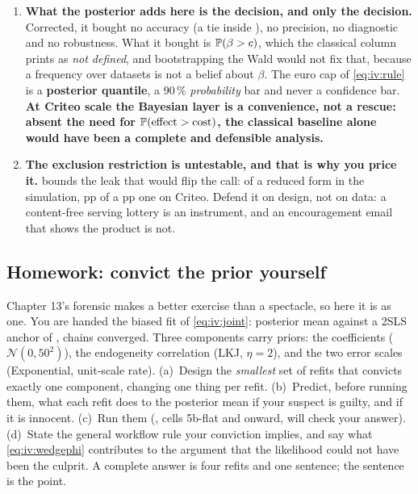 \begin{enumerate}[leftmargin=*, itemsep=.45em]
  \item \textbf{What the posterior adds here is the decision, and only the decision.} Corrected,
        it bought no accuracy (a tie inside \eur{\nbElevenTieTol}), no precision, no diagnostic and
        no robustness. What it bought is
        $\operatorname{\mathbb{P}}(\beta > c)$, which the classical column prints as \emph{not defined}, and
        bootstrapping the Wald would not fix that, because a frequency over datasets is not a belief
        about $\beta$. The euro cap of \cref{eq:iv:rule} is a \textbf{posterior quantile}, a 90\,\%
        \emph{probability} bar and never a confidence bar. \textbf{At Criteo scale the Bayesian layer
        is a convenience, not a rescue: absent the need for $\operatorname{\mathbb{P}}(\text{effect} > \text{cost})$, the
        classical baseline alone would have been a complete and defensible analysis.}

  \item \textbf{The exclusion restriction is untestable, and that is why you price it.}
         bounds the leak that would flip the call: \eur{\nbElevenBreakDelta}
        of a \eur{\nbElevenReduced} reduced form in the simulation, \nbElevenBDeltaStar{} pp of a
        \nbElevenBReduced{} pp one on Criteo. Defend it on design, not on data: a content-free
        serving lottery is an instrument, and an encouragement email that shows the product is not.
\end{enumerate}

\subsection*{Homework: convict the prior yourself}

Chapter 13's forensic makes a better exercise than a spectacle, so here it is as one. You are
handed the biased fit of \cref{eq:iv:joint}: posterior mean \eur{\nbElevenGaussMean} against a
2SLS anchor of \eur{\nbElevenIvEst}, chains converged. Three components carry priors: the
coefficients ($\mathcal N(0, 50^2)$), the endogeneity correlation (LKJ, $\eta = 2$), and the
two error scales (Exponential, unit-scale rate). (a)~Design the \emph{smallest} set of refits
that convicts exactly one component, changing one thing per refit. (b)~Predict, before running
them, what each refit does to the posterior mean if your suspect is guilty, and if it is
innocent. (c)~Run them (, cells 5b-flat and onward, will check your answer).
(d)~State the general workflow rule your conviction implies, and say what \cref{eq:iv:wedgephi}
contributes to the argument that the likelihood could not have been the culprit. A complete
answer is four refits and one sentence; the sentence is the point.

